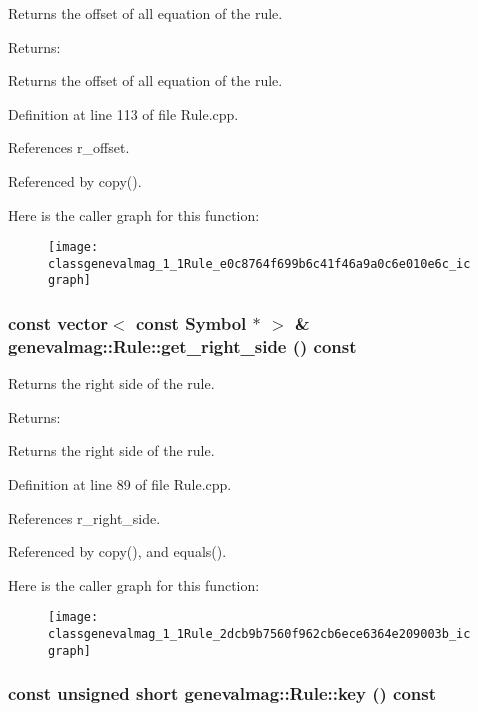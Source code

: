 Returns the offset of all equation of the rule. \begin{Desc}
\item[Returns:]\end{Desc}
Returns the offset of all equation of the rule. 

Definition at line 113 of file Rule.cpp.

References r\_\-offset.

Referenced by copy().

Here is the caller graph for this function:\nopagebreak
\begin{figure}[H]
\begin{center}
\leavevmode
\texttt{[image: classgenevalmag\_1\_1Rule\_e0c8764f699b6c41f46a9a0c6e010e6c\_icgraph]}
\end{center}
\end{figure}
\hypertarget{classgenevalmag_1_1Rule_2dcb9b7560f962cb6ece6364e209003b}{
\subsubsection[{get\_\-right\_\-side}]{\setlength{\rightskip}{0pt plus 5cm}const vector$<$ const {\bf Symbol} $\ast$ $>$ \& genevalmag::Rule::get\_\-right\_\-side () const}}
\label{classgenevalmag_1_1Rule_2dcb9b7560f962cb6ece6364e209003b}


Returns the right side of the rule. \begin{Desc}
\item[Returns:]\end{Desc}
Returns the right side of the rule. 

Definition at line 89 of file Rule.cpp.

References r\_\-right\_\-side.

Referenced by copy(), and equals().

Here is the caller graph for this function:\nopagebreak
\begin{figure}[H]
\begin{center}
\leavevmode
\texttt{[image: classgenevalmag\_1\_1Rule\_2dcb9b7560f962cb6ece6364e209003b\_icgraph]}
\end{center}
\end{figure}
\hypertarget{classgenevalmag_1_1Rule_3f83cca5fc997bdc3c6404eaa57a17ca}{
\subsubsection[{key}]{\setlength{\rightskip}{0pt plus 5cm}const unsigned short genevalmag::Rule::key () const}}
\label{classgenevalmag_1_1Rule_3f83cca5fc997bdc3c6404eaa57a17ca}


